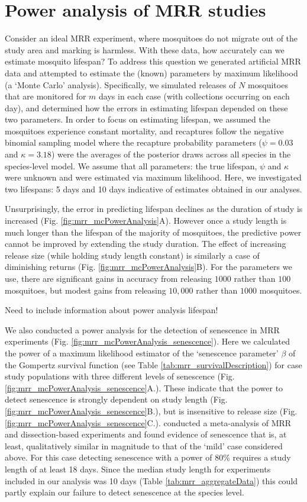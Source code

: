 \documentclass[12pt]{article}
\begin{document}
\section{Power analysis of MRR studies}
Consider an ideal MRR experiment, where mosquitoes do not migrate out of the study area and marking is harmless. With these data, how accurately can we estimate mosquito lifespan? To address this question we generated artificial MRR data and attempted to estimate the (known) parameters by maximum likelihood (a `Monte Carlo' analysis). Specifically, we simulated releases of $N$ mosquitoes that are monitored for $m$ days in each case (with collections occurring on each day), and determined how the errors in estimating lifespan depended on these two parameters. In order to focus on estimating lifespan, we assumed the mosquitoes experience constant mortality, and recaptures follow the negative binomial sampling model where the recapture probability parameters ($\psi=0.03$ and $\kappa=3.18$) were the averages of the posterior draws across all species in the species-level model. We assume that all parameters: the true lifespan, $\psi$ and $\kappa$ were unknown and were estimated via maximum likelihood. Here, we investigated two lifespans: 5 days and 10 days indicative of estimates obtained in our analyses.

Unsurprisingly, the error in predicting lifespan declines as the duration of study is increased (Fig. \ref{fig:mrr_mcPowerAnalysis}A). However once a study length is much longer than the lifespan of the majority of mosquitoes, the predictive power cannot be improved by extending the study duration. The effect of increasing release size (while holding study length constant) is similarly a case of diminishing returns (Fig. \ref{fig:mrr_mcPowerAnalysis}B). For the parameters we use, there are significant gains in accuracy from releasing $1000$ rather than $100$ mosquitoes, but modest gains from releasing $10,000$ rather than $1000$ mosquitoes.

Need to include information about power analysis lifespan!

We also conducted a power analysis for the detection of senescence in MRR experiments (Fig. \ref{fig:mrr_mcPowerAnalysis_senescence}). Here we calculated the power of a maximum likelihood estimator of the `senescence parameter' $\beta$ of the Gompertz survival function (see Table \ref{tab:mrr_survivalDescription}) for case study populations with three different levels of senescence (Fig. \ref{fig:mrr_mcPowerAnalysis_senescence}A.). These indicate that the power to detect senescence is strongly dependent on study length (Fig. \ref{fig:mrr_mcPowerAnalysis_senescence}B.), but is insensitive to release size (Fig. \ref{fig:mrr_mcPowerAnalysis_senescence}C.). \cite{clements1981analysis} conducted a meta-analysis of MRR and dissection-based experiments and found evidence of senescence that is, at least, qualitatively similar in magnitude to that of the `mild' case considered above. For this case detecting senescence with a power of 80\% requires a study length of at least 18 days. Since the median study length for experiments included in our analysis was 10 days (Table \ref{tab:mrr_aggregateData}) this could partly explain our failure to detect senescence at the species level.
\end{document}
